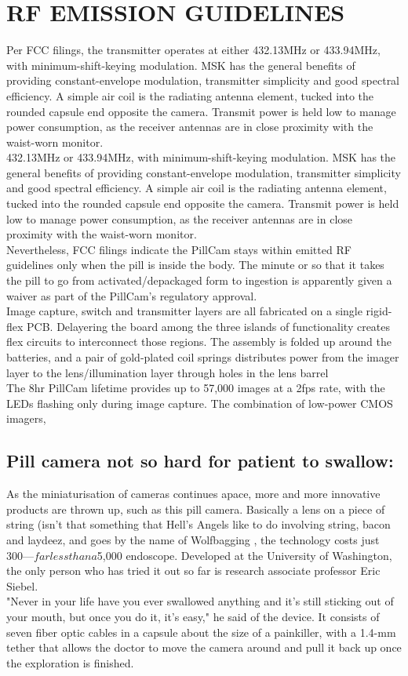 \documentclass{article}
\begin{document}
\section{RF EMISSION GUIDELINES}
Per FCC filings, the transmitter operates at either 432.13MHz or 433.94MHz, with minimum-shift-keying modulation. MSK has the general benefits of providing constant-envelope modulation, transmitter simplicity and good spectral efficiency. A simple air coil is the radiating antenna element, tucked into the rounded capsule end opposite the camera. Transmit power is held low to manage power consumption, as the receiver antennas are in close proximity with the waist-worn monitor. 
\\432.13MHz or 433.94MHz, with minimum-shift-keying modulation. MSK has the general benefits of providing constant-envelope modulation, transmitter simplicity and good spectral efficiency. A simple air coil is the radiating antenna element, tucked into the rounded capsule end opposite the camera. Transmit power is held low to manage power consumption, as the receiver antennas are in close proximity with the waist-worn monitor.
\\Nevertheless, FCC filings indicate the PillCam stays within emitted RF guidelines only when the pill is inside the body. The minute or so that it takes the pill to go from activated/depackaged form to ingestion is apparently given a waiver as part of the PillCam's regulatory approval.
\\Image capture, switch and transmitter layers are all fabricated on a single rigid-flex PCB. Delayering the board among the three islands of functionality creates flex circuits to interconnect those regions. The assembly is folded up around the batteries, and a pair of gold-plated coil springs distributes power from the imager layer to the lens/illumination layer through holes in the lens barrel
\\The 8hr PillCam lifetime provides up to 57,000 images at a 2fps rate, with the LEDs flashing only during image capture. The combination of low-power CMOS imagers,

\subsection{Pill camera not so hard for patient to swallow:}
As the miniaturisation of cameras continues apace, more and more innovative products are thrown up, such as this pill camera. Basically a lens on a piece of string (isn't that something that Hell's Angels like to do involving string, bacon and laydeez, and goes by the name of Wolfbagging , the technology costs just $300—far less than a $5,000 endoscope. Developed at the University of Washington, the only person who has tried it out so far is research associate professor Eric Siebel.
\\"Never in your life have you ever swallowed anything and it's still sticking out of your mouth, but once you do it, it's easy," he said of the device. It consists of seven fiber optic cables in a capsule about the size of a painkiller, with a 1.4-mm tether that allows the doctor to move the camera around and pull it back up once the exploration is finished.
\end{document}
